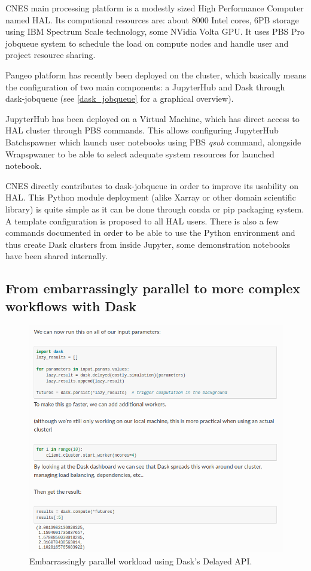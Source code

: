 \documentclass{article}
\begin{document}
CNES main processing platform is a modestly sized High Performance Computer named HAL. Its computional resources are: about 8000 Intel cores, 6PB storage using IBM Spectrum Scale technology, some NVidia Volta GPU. It uses PBS Pro jobqueue system to schedule the load on compute nodes and handle user and project resource sharing.

Pangeo platform has recently been deployed on the cluster, which basically means the configuration of two main components: a JupyterHub and Dask through dask-jobqueue (see \ref{dask_jobqueue} for a graphical overview).

JupyterHub has been deployed on a Virtual Machine, which has direct access to HAL cluster through PBS commands. This allows configuring JupyterHub Batchspawner which launch user notebooks using PBS \textit{qsub} command, alongside Wrapspwaner to be able to select adequate system resources for launched notebook. 

CNES directly contributes to dask-jobqueue in order to improve its usability on HAL. This Python module deployment (alike Xarray or other domain scientific library) is quite simple as it can be done through conda or pip packaging system. A template configuration is proposed to all HAL users. There is also a few commands documented in order to be able to use the Python environment and thus create Dask clusters from inside Jupyter, some demonstration notebooks have been shared internally.

\subsection{From embarrassingly parallel to more complex workflows with Dask}
\label{ssec:usecase1}

\begin{figure}
  \centering
  \includegraphics[width=0.8\columnwidth]{ep_dask_code.png}
  \caption{\label{ep_dask_code} Embarrassingly parallel workload using Dask's Delayed API.}
\end{figure}
\end{document}
